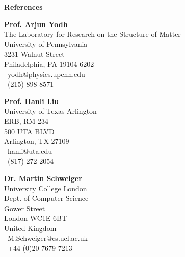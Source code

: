 \documentclass{my_cv}
\begin{document}
\vspace{-2mm}
\begin{center} 
\begin{footnotesize}
\end{footnotesize}

\href{https://www.linkedin.com/in/venkaiahchowdarykavuri}{\faLinkedinSquare} \href{https://github.com/Venki-Kavuri}{\faGithub} \href{https://scholar.google.com/citations?hl=en&user=r5E9ACIAAAAJ&view_op=list_works}{\aiGoogleScholar} \href{https://www.facebook.com/venki.kavuri}{\faFacebookOfficial}
\end{center} 

\textbf{References}
\vspace{5mm} 


\textbf{Prof. Arjun Yodh}\\
The Laboratory for Research on the Structure of Matter\\ 
University of Pennsylvania\\
3231 Walnut Street\\
Philadelphia, PA 19104-6202\\
\Email\, yodh@physics.upenn.edu\\	
\Telefon\, (215) 898-8571\\

\vspace{20mm} 

\textbf{Prof. Hanli Liu}\\
University of Texas Arlington\\ 
ERB, RM 234\\
500 UTA BLVD\\ 
Arlington, TX 27109\\
\Email\, hanli@uta.edu\\	
\Telefon\, (817) 272-2054\\

\vspace{20mm} 

\textbf{Dr. Martin Schweiger}\\
University College London\\
Dept. of Computer Science\\
Gower Street\\
London WC1E 6BT\\
United Kingdom\\
\Email\, M.Schweiger@cs.ucl.ac.uk\\	
\Telefon\, +44 (0)20 7679 7213\\



\vspace{5mm} 
\end{document}
